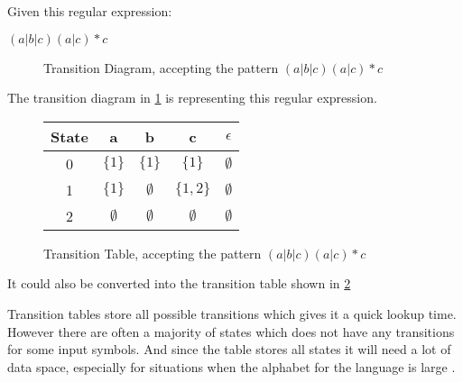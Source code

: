 \begin{example} \label{regexp2td}
Given this regular expression:
\begin{center}
    $(a|b|c)(a|c)* c$ 
\end{center}

\begin{figure}[h!]
  \centering
  \caption{Transition Diagram, accepting the pattern $(a|b|c)(a|c)* c$
  \label{fig:td}}
\end{figure}

The transition diagram in \cref{fig:td} is representing this regular expression.

\begin{figure}[h!]
  \centering
  \begin{tabular}{| c | c c c c |}
    \hline
    \hline
    State & a & b & c & $\epsilon$\\
    \hline
    0 & $\{1\}$ & $\{1\}$ & $\{1\}$ & $\emptyset$ \\
    1 & $\{1\}$ & $\emptyset$ & $\{1,2\}$ & $\emptyset$ \\
    2 & $\emptyset$ & $\emptyset$ & $\emptyset$ & $\emptyset$ \\
    \hline
  \end{tabular}
  \caption{Transition Table, accepting the pattern $(a|b|c)(a|c)* c$
  \label{fig:tt}}
\end{figure}

It could also be converted into the transition table shown in \cref{fig:tt}
\end{example}

Transition tables store all possible transitions which gives it a quick lookup time. However there are often a majority of states which does not have any transitions for some input symbols. And since the table stores all states it will need a lot of data space, especially for situations when the alphabet for the language is large \cite{Aho2006}.

